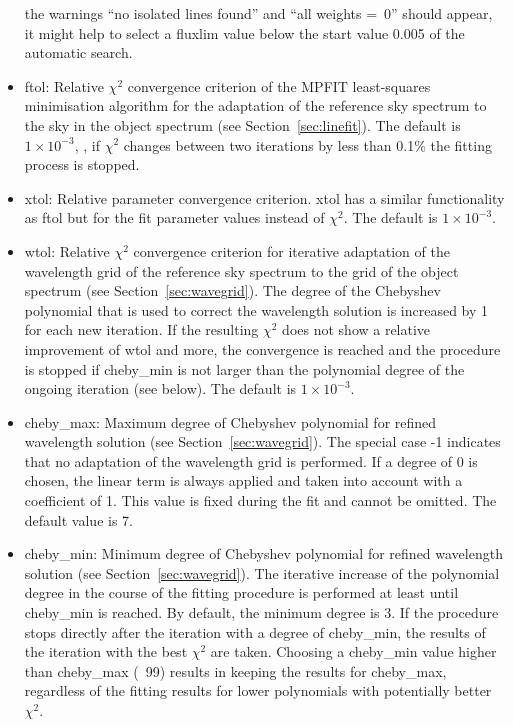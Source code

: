 \begin{itemize}
the warnings ``no isolated lines found'' and ``all weights =~0'' should appear,
it might help to select a {\sc fluxlim} value below the start value 0.005 of
the automatic search.
\item {\sc ftol}: Relative $\chi^2$ convergence criterion of the MPFIT
least-squares minimisation algorithm for the adaptation of the reference sky
spectrum to the sky in the object spectrum (see Section~\ref{sec:linefit}).
The default is $1 \times 10^{-3}$, \ie, if $\chi^2$ changes between two
iterations by less than 0.1\% the fitting process is stopped.
\item {\sc xtol}: Relative parameter convergence criterion. {\sc xtol} has a
similar functionality as {\sc ftol} but for the fit parameter values instead of
$\chi^2$. The default is $1 \times 10^{-3}$.
\item {\sc wtol}: Relative $\chi^2$ convergence criterion for iterative
adaptation of the wavelength grid of the reference sky spectrum to the grid of
the object spectrum (see Section~\ref{sec:wavegrid}). The degree of the
Chebyshev polynomial that is used to correct the wavelength solution is
increased by 1 for each new iteration. If the resulting $\chi^2$ does not
show a relative improvement of {\sc wtol} and more, the convergence is reached
and the procedure is stopped if {\sc cheby\_min} is not larger than the
polynomial degree of the ongoing iteration (see below). The default is
$1 \times 10^{-3}$.
\item {\sc cheby\_max}: Maximum degree of Chebyshev polynomial for refined
wavelength solution (see Section~\ref{sec:wavegrid}). The special case -1
indicates that no adaptation of the wavelength grid is performed. If a degree
of 0 is chosen, the linear term is always applied and taken into account with
a coefficient of 1. This value is fixed during the fit and cannot be omitted.
The default value is 7.
\item {\sc cheby\_min}: Minimum degree of Chebyshev polynomial for refined
wavelength solution (see Section~\ref{sec:wavegrid}). The iterative increase
of the polynomial degree in the course of the fitting procedure is performed
at least until {\sc cheby\_min} is reached. By default, the minimum degree is
3. If the procedure stops directly after the iteration with a degree of
{\sc cheby\_min}, the results of the iteration with the best $\chi^2$ are
taken. Choosing a {\sc cheby\_min} value higher than {\sc cheby\_max} (\eg\ 99)
results in keeping the results for {\sc cheby\_max}, regardless of the fitting
results for lower polynomials with potentially better $\chi^2$.

\end{itemize}
